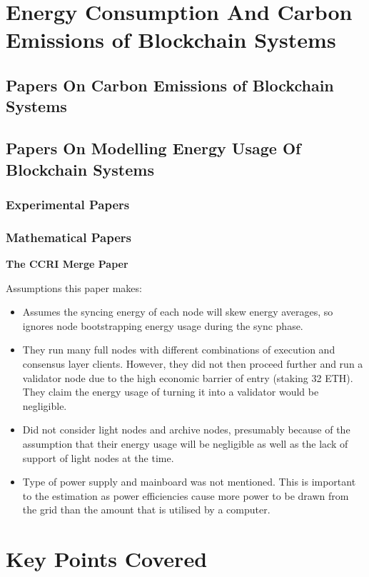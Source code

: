 \section{Energy Consumption And Carbon Emissions of Blockchain Systems}




\subsection{Papers On Carbon Emissions of Blockchain Systems}



\subsection{Papers On Modelling Energy Usage Of Blockchain Systems}



\subsubsection{Experimental Papers}




\subsubsection{Mathematical Papers}




\textbf{The CCRI Merge Paper } \cite{CCRI:Network}

Assumptions this paper makes:
\begin{itemize}
    \item Assumes the syncing energy of each node will skew energy averages, so ignores node bootstrapping energy usage during the sync phase.
    
    \item They run many full nodes with different combinations of execution and consensus layer clients. However, they did not then proceed further and run a validator node due to the high economic barrier of entry (staking 32 ETH). They claim the energy usage of turning it into a validator would be negligible.
    
    \item Did not consider light nodes and archive nodes, presumably because of the assumption that their energy usage will be negligible as well as the lack of support of light nodes at the time.

    \item Type of power supply and mainboard was not mentioned. This is important to the estimation as power efficiencies cause more power to be drawn from the grid than the amount that is utilised by a computer.
\end{itemize}





\section{Key Points Covered}
